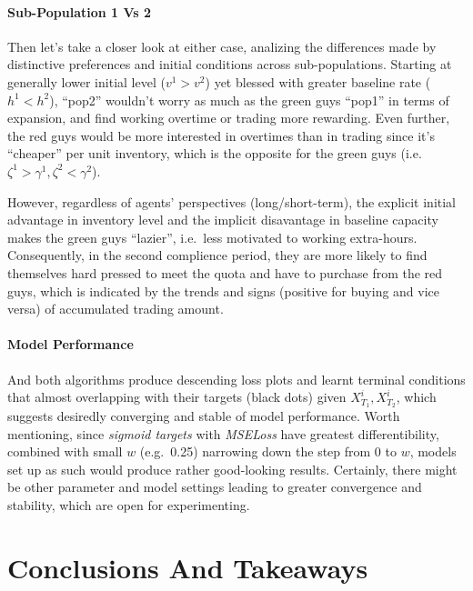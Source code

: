 \documentclass{article}
\begin{document}
{\hypertarget{sub-population-1-vs-2}{%
\paragraph{Sub-Population 1 Vs 2}\label{sub-population-1-vs-2}}

Then let's take a closer look at either case, analizing the differences
made by distinctive preferences and initial conditions across
sub-populations. Starting at generally lower initial level (\(v^1>v^2\))
yet blessed with greater baseline rate (\(h^1<h^2\)), ``pop2'' wouldn't
worry as much as the green guys ``pop1'' in terms of expansion, and find
working overtime or trading more rewarding. Even further, the red guys
would be more interested in overtimes than in trading since it's
``cheaper'' per unit inventory, which is the opposite for the green guys
(i.e.~\(\zeta^1>\gamma^1, \zeta^2<\gamma^2\)).

However, regardless of agents' perspectives (long/short-term), the
explicit initial advantage in inventory level and the implicit
disavantage in baseline capacity makes the green guys ``lazier'',
i.e.~less motivated to working extra-hours. Consequently, in the second
complience period, they are more likely to find themselves hard pressed
to meet the quota and have to purchase from the red guys, which is
indicated by the trends and signs (positive for buying and vice versa)
of accumulated trading amount.

\hypertarget{model-performance}{%
\paragraph{Model Performance}\label{model-performance}}

And both algorithms produce descending loss plots and learnt terminal
conditions that almost overlapping with their targets (black dots) given
\(X_{T_1}^i, X_{T_2}^i\), which suggests desiredly converging and stable
of model performance. Worth mentioning, since \emph{sigmoid targets}
with \emph{MSELoss} have greatest differentibility, combined with small
\(w\) (e.g.~0.25) narrowing down the step from 0 to \(w\), models set up
as such would produce rather good-looking results. Certainly, there
might be other parameter and model settings leading to greater
convergence and stability, which are open for experimenting.

\hypertarget{conclusions-and-takeaways}{%
\section{Conclusions And Takeaways}\label{conclusions-and-takeaways}}

}
\end{document}
